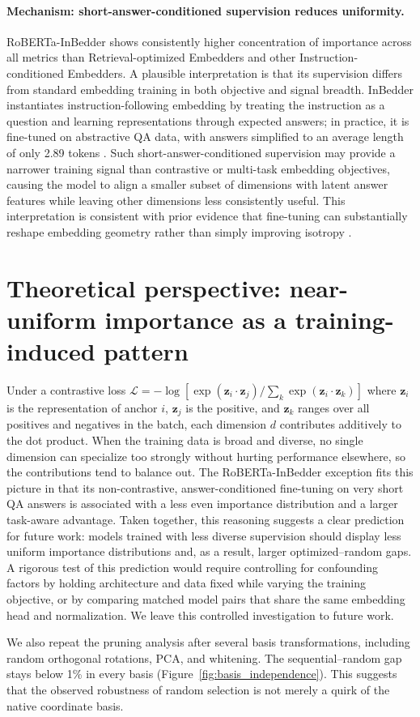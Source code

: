 \documentclass[11pt]{article}
\begin{document}
\paragraph{Mechanism: short-answer-conditioned supervision reduces uniformity.}
RoBERTa-InBedder shows consistently higher concentration of importance across all metrics than Retrieval-optimized Embedders and other Instruction-conditioned Embedders. A plausible interpretation is that its supervision differs from standard embedding training in both objective and signal breadth. InBedder instantiates instruction-following embedding by treating the instruction as a question and learning representations through expected answers; in practice, it is fine-tuned on abstractive QA data, with answers simplified to an average length of only 2.89 tokens \citep{inbedder}. Such short-answer-conditioned supervision may provide a narrower training signal than contrastive or multi-task embedding objectives, causing the model to align a smaller subset of dimensions with latent answer features while leaving other dimensions less consistently useful. This interpretation is consistent with prior evidence that fine-tuning can substantially reshape embedding geometry rather than simply improving isotropy \citep{rajaee2021fine}.

\section{Theoretical perspective: near-uniform importance as a training-induced pattern}
\label{theoretical_perspective}
Under a contrastive loss $\mathcal{L} = -\log[\exp(\mathbf{z}_i \cdot \mathbf{z}_j) / \sum_{k} \exp(\mathbf{z}_i \cdot \mathbf{z}_k)]$ where $\mathbf{z}_i$ is the representation of anchor $i$, $\mathbf{z}_j$ is the positive, and $\mathbf{z}_k$ ranges over all positives and negatives in the batch, each dimension $d$ contributes additively to the dot product. When the training data is broad and diverse, no single dimension can specialize too strongly without hurting performance elsewhere, so the contributions tend to balance out. The RoBERTa-InBedder exception fits this picture in that its non-contrastive, answer-conditioned fine-tuning on very short QA answers is associated with a less even importance distribution and a larger task-aware advantage. Taken together, this reasoning suggests a clear prediction for future work: models trained with less diverse supervision should display less uniform importance distributions and, as a result, larger optimized–random gaps. A rigorous test of this prediction would require controlling for confounding factors by holding architecture and data fixed while varying the training objective, or by comparing matched model pairs that share the same embedding head and normalization. We leave this controlled investigation to future work.

We also repeat the pruning analysis after several basis transformations, including random orthogonal rotations, PCA, and whitening. The sequential--random gap stays below 1\% in every basis (Figure~\ref{fig:basis_independence}). This suggests that the observed robustness of random selection is not merely a quirk of the native coordinate basis.
\end{document}
